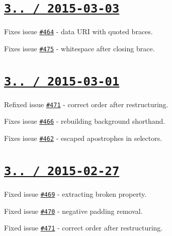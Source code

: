 \section*{\href{https://github.com/jakubpawlowicz/clean-css/compare/v3.1.2...v3.1.3}{\tt 3.. / 2015-\/03-\/03} }


\begin{DoxyItemize}
\item Fixes issue \href{https://github.com/jakubpawlowicz/clean-css/issues/464}{\tt \#464} -\/ data U\+RI with quoted braces.
\item Fixes issue \href{https://github.com/jakubpawlowicz/clean-css/issues/475}{\tt \#475} -\/ whitespace after closing brace.
\end{DoxyItemize}

\section*{\href{https://github.com/jakubpawlowicz/clean-css/compare/v3.1.1...v3.1.2}{\tt 3.. / 2015-\/03-\/01} }


\begin{DoxyItemize}
\item Refixed issue \href{https://github.com/jakubpawlowicz/clean-css/issues/471}{\tt \#471} -\/ correct order after restructuring.
\item Fixes issue \href{https://github.com/jakubpawlowicz/clean-css/issues/466}{\tt \#466} -\/ rebuilding background shorthand.
\item Fixes issue \href{https://github.com/jakubpawlowicz/clean-css/issues/462}{\tt \#462} -\/ escaped apostrophes in selectors.
\end{DoxyItemize}

\section*{\href{https://github.com/jakubpawlowicz/clean-css/compare/v3.1.0...v3.1.1}{\tt 3.. / 2015-\/02-\/27} }


\begin{DoxyItemize}
\item Fixed issue \href{https://github.com/jakubpawlowicz/clean-css/issues/469}{\tt \#469} -\/ extracting broken property.
\item Fixed issue \href{https://github.com/jakubpawlowicz/clean-css/issues/470}{\tt \#470} -\/ negative padding removal.
\item Fixed issue \href{https://github.com/jakubpawlowicz/clean-css/issues/471}{\tt \#471} -\/ correct order after restructuring.
\end{DoxyItemize}

